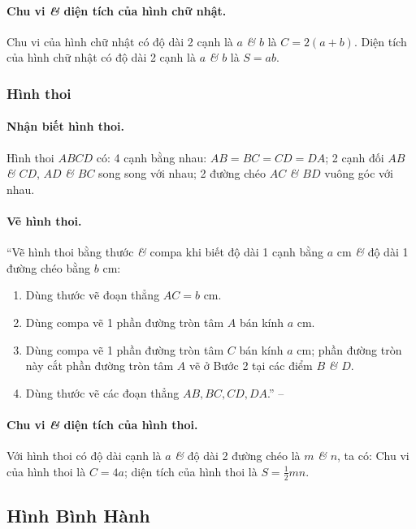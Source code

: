 \documentclass{article}
\numberwithin{equation}{section}
\begin{document}
\paragraph{Chu vi \textit{\&} diện tích của hình chữ nhật.} Chu vi của hình chữ nhật có độ dài 2 cạnh là $a$ \textit{\&} $b$ là $C = 2(a + b)$. Diện tích của hình chữ nhật có độ dài 2 cạnh là $a$ \textit{\&} $b$ là $S = ab$.

\subsubsection{Hình thoi}

\paragraph{Nhận biết hình thoi.} Hình thoi $ABCD$ có: 4 cạnh bằng nhau: $AB = BC = CD = DA$; 2 cạnh đối $AB$ \textit{\&} $CD$, $AD$ \textit{\&} $BC$ song song với nhau; 2 đường chéo $AC$ \textit{\&} $BD$ vuông góc với nhau.

\paragraph{Vẽ hình thoi.} ``Vẽ hình thoi bằng thước \textit{\&} compa khi biết độ dài 1 cạnh bằng $a$ cm \textit{\&} độ dài 1 đường chéo bằng $b$ cm:
\begin{enumerate}
	\item Dùng thước vẽ đoạn thẳng $AC = b$ cm.
	\item Dùng compa vẽ 1 phần đường tròn tâm $A$ bán kính $a$ cm.
	\item Dùng compa vẽ 1 phần đường tròn tâm $C$ bán kính $a$ cm; phần đường tròn này cắt phần đường tròn tâm $A$ vẽ ở Bước 2 tại các điểm $B$ \textit{\&} $D$.
	\item Dùng thước vẽ các đoạn thẳng $AB,BC,CD,DA$.'' -- \cite[p. 100]{Thai_Anh_Dat_Ha_Loan_Nam_Quang_Toan_6_tap_1}
\end{enumerate}

\paragraph{Chu vi \textit{\&} diện tích của hình thoi.} Với hình thoi có độ dài cạnh là $a$ \textit{\&} độ dài 2 đường chéo là $m$ \textit{\&} $n$, ta có: Chu vi của hình thoi là $C = 4a$; diện tích của hình thoi là $S = \frac{1}{2}mn$.

\subsection{Hình Bình Hành}
\end{document}
